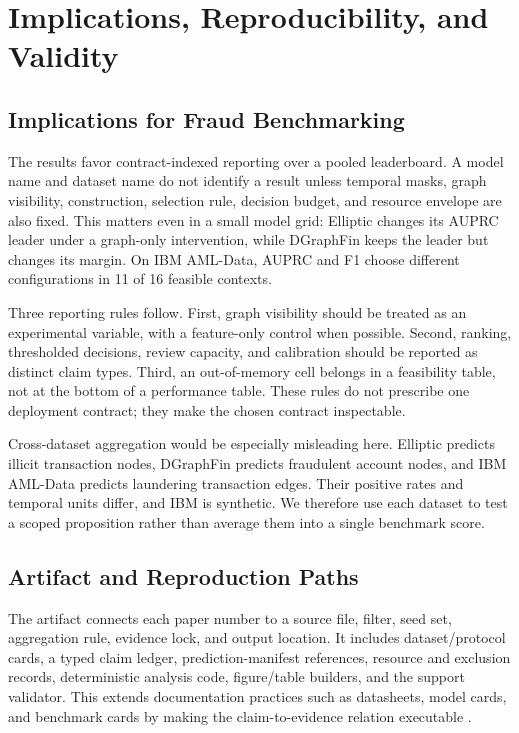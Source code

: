 \section{Implications, Reproducibility, and Validity}
\label{sec:implications-validity}

\subsection{Implications for Fraud Benchmarking}

The results favor contract-indexed reporting over a pooled leaderboard. A model name and dataset name do not identify a result unless temporal masks, graph visibility, construction, selection rule, decision budget, and resource envelope are also fixed. This matters even in a small model grid: Elliptic changes its AUPRC leader under a graph-only intervention, while DGraphFin keeps the leader but changes its margin. On IBM AML-Data, AUPRC and F1 choose different configurations in 11 of 16 feasible contexts.

Three reporting rules follow. First, graph visibility should be treated as an experimental variable, with a feature-only control when possible. Second, ranking, thresholded decisions, review capacity, and calibration should be reported as distinct claim types. Third, an out-of-memory cell belongs in a feasibility table, not at the bottom of a performance table. These rules do not prescribe one deployment contract; they make the chosen contract inspectable.

Cross-dataset aggregation would be especially misleading here. Elliptic predicts illicit transaction nodes, DGraphFin predicts fraudulent account nodes, and IBM AML-Data predicts laundering transaction edges. Their positive rates and temporal units differ, and IBM is synthetic. We therefore use each dataset to test a scoped proposition rather than average them into a single benchmark score.

\subsection{Artifact and Reproduction Paths}

The artifact connects each paper number to a source file, filter, seed set, aggregation rule, evidence lock, and output location. It includes dataset/protocol cards, a typed claim ledger, prediction-manifest references, resource and exclusion records, deterministic analysis code, figure/table builders, and the support validator. This extends documentation practices such as datasheets, model cards, and benchmark cards by making the claim-to-evidence relation executable \cite{gebru2021datasheets,mitchell2019modelcards,sokol2025benchmarkcards}.

